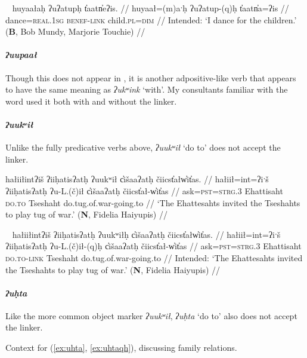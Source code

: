 \ex~ \label{ex:uatuph2}
\begingl
\glpreamble *huyaałaḥ ʔuʔatupḥ t̓aatn̓eʔis. //
\gla huyaał=(m)aˑḥ ʔuʔatup-(q)ḥ t̓aatn̓a=ʔis //
\glb dance=\textsc{real.1sg} \textsc{benef}-\textsc{link} child.\textsc{pl}=\textsc{dim} //
\glft Intended: `I dance for the children.' (\textbf{B}, Bob Mundy, Marjorie Touchie) //
\endgl
\xe

\paragraph{\textit{ʔuupaał}} Though this does not appear in \cite{woo2007b}, it is another adpositive-like verb that appears to have the same meaning as \textit{ʔukʷink} `with'. My consultants familiar with the word used it both with and without the linker.

	
\paragraph{\textit{ʔuukʷił}} \label{sec:link:uukwil} Unlike the fully predicative verbs above, \textit{ʔuukʷił} `do to' does not accept the linker.

\ex \label{ex:tugofwar1}
\begingl
\glpreamble hałiiłintʔiš ʔiiḥatisʔatḥ ʔuukʷił c̓išaaʔatḥ čiicst̓ałw̓it̓as. //
\gla hałiił=int=ʔiˑš ʔiiḥatisʔatḥ ʔu-L.(č)ił c̓išaaʔatḥ čiicst̓ał-w̓it̓as //
\glb ask=\textsc{pst}=\textsc{strg.3} Ehattisaht \textsc{do.to} Tseshaht do.tug.of.war-going.to //
\glft `The Ehattesahts invited the Tseshahts to play tug of war.' (\textbf{N}, Fidelia Haiyupis) //
\endgl
\xe

\ex~ \label{ex:tugofwar2}
\begingl
\glpreamble *hałiiłintʔiš ʔiiḥatisʔatḥ ʔuukʷiłḥ c̓išaaʔatḥ čiicst̓ałw̓it̓as. //
\gla hałiił=int=ʔiˑš ʔiiḥatisʔatḥ ʔu-L.(č)ił-(q)ḥ c̓išaaʔatḥ čiicst̓ał-w̓it̓as //
\glb ask=\textsc{pst}=\textsc{strg.3} Ehattisaht \textsc{do.to}-\textsc{link} Tseshaht do.tug.of.war-going.to //
\glft Intended: `The Ehattesahts invited the Tseshahts to play tug of war.' (\textbf{N}, Fidelia Haiyupis) //
\endgl
\xe

\paragraph{\textit{ʔuḥta}} \label{sec:link:uhta} Like the more common object marker \textit{ʔuukʷił}, \textit{ʔuḥta} `do to' also does not accept the linker.

\vspace{5pt}

\noindent Context for (\ref{ex:uhta}, \ref{ex:uhtaqh}), discussing family relations.

